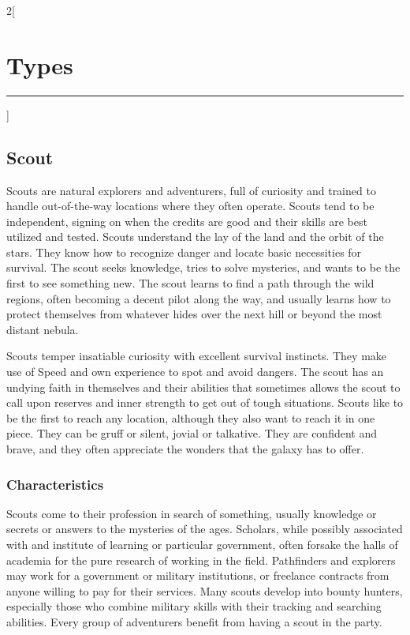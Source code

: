 \documentclass[a4paper,10pt,final]{book}
\newcommand{\HRule}{\rule{\linewidth}{0.5mm}} %
\newcommand{\newSection}[1]{\section*{#1} \addcontentsline{toc}{section}{#1} \label{sec:#1} \HRule}
\newenvironment{docsection}[1]
{
  \begin{multicols*}{2}[\newSection{#1}]
}
{
  \end{multicols*}
  \newpage
}
\begin{document}
\begin{docsection}{Types}
\subsection*{Scout} %
\label{sub:scout}
Scouts are natural explorers and adventurers, full of curiosity and trained to handle out-of-the-way locations where they often operate. Scouts tend to be independent, signing on when the credits are good and their skills are best utilized and tested. Scouts understand the lay of the land and the orbit of the stars. They know how to recognize danger and locate basic necessities for survival. The scout seeks knowledge, tries to solve mysteries, and wants to be the first to see something new. The scout learns to find a path through the wild regions, often becoming a decent pilot along the way, and usually learns how to protect themselves from whatever hides over the next hill or beyond the most distant nebula. \par

Scouts temper insatiable curiosity with excellent survival instincts. They make use of Speed and own experience to spot and avoid dangers. The scout has an undying faith in themselves and their abilities that sometimes allows the scout to call upon reserves and inner strength to get out of tough situations. Scouts like to be the first to reach any location, although they also want to reach it in one piece. They can be gruff or silent, jovial or talkative. They are confident and brave, and they often appreciate the wonders that the galaxy has to offer.

\subsubsection*{Characteristics}
\label{subsub:scoutCharacteristics}
Scouts come to their profession in search of something, usually knowledge or secrets or answers to the mysteries of the ages. Scholars, while possibly associated with and institute of learning or particular government, often forsake the halls of academia for the pure research of working in the field. Pathfinders and explorers may work for a government or military institutions, or freelance contracts from anyone willing to pay for their services. Many scouts develop into bounty hunters, especially those who combine military skills with their tracking and searching abilities. Every group of adventurers benefit from having a scout in the party.\par


\end{docsection}
\end{document}

